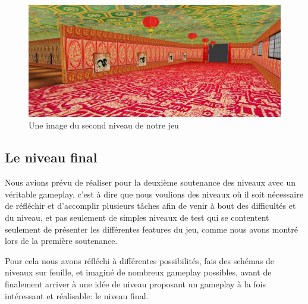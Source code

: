 \documentclass[12pt]{article}
\begin{document}
\begin{figure}[h]
\centering
\includegraphics[scale=0.5]{2.jpg}
\caption{Une image du second niveau de notre jeu}
\end{figure}

\subsection{Le niveau final}

Nous avions prévu de réaliser pour la deuxième soutenance des niveaux avec un véritable gameplay, c'est à dire que nous voulions des niveaux où il soit nécessaire de réfléchir et d'accomplir plusieurs tâches afin de venir à bout des difficultés et du niveau, et pas seulement de simples niveaux de test qui se contentent seulement de présenter les différentes features du jeu, comme nous avons montré lors de la première soutenance.

\newpage

Pour cela nous avons réfléchi à différentes possibilités, fais des schémas de niveaux sur feuille, et imaginé de nombreux gameplay possibles, avant de finalement arriver à une idée de niveau proposant un gameplay à la fois intéressant et réalisable: le niveau final.\\
\end{document}
